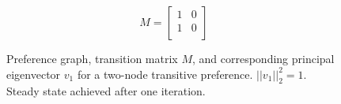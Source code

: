 \begin{figure}[!htb] %
\centering
\begin{minipage}{1.2in}
\end{minipage}
\hfill
\begin{minipage}{1.2in}
\[
M=
  \begin{bmatrix}
    1 & 0 \\
    1 & 0 \\
  \end{bmatrix}
\]
\end{minipage}
\hfill
\begin{minipage}{1.2in}
\end{minipage}
\caption{Preference graph, transition matrix $M$, and corresponding principal eigenvector $v_1$ for a two-node transitive preference. $||v_1||_2^2 = 1$. Steady state achieved after one iteration.}
\label{fig:linalg_1} 
\end{figure}



